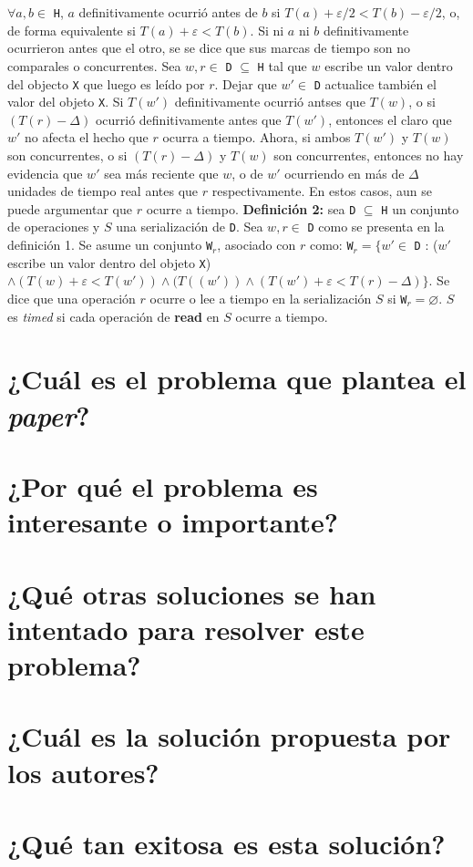 $\forall a, b \in$ \texttt{H}, $a$ definitivamente ocurrió antes de $b$ si $T(a) + \varepsilon/2 < T(b) - \varepsilon/2$, o, de forma equivalente si $T(a) + \varepsilon < T(b)$. Si ni $a$ ni $b$ definitivamente ocurrieron antes que el otro, se se dice que sus marcas de tiempo son no comparales o concurrentes. Sea $w, r \in$ \texttt{D} $\subseteq$ \texttt{H} tal que $w$ escribe un valor dentro del objecto \texttt{X} que luego es leído por $r$. Dejar que $w' \in$ \texttt{D} actualice también el valor del objeto \texttt{X}. Si $T(w')$ definitivamente ocurrió antses que $T(w)$, o si $(T(r) - \Delta)$ ocurrió definitivamente antes que $T(w')$, entonces el claro que $w'$ no afecta el hecho que $r$ ocurra a tiempo. Ahora, si ambos $T(w')$ y $T(w)$ son concurrentes, o si $(T(r) - \Delta)$ y $T(w)$ son concurrentes, entonces no hay evidencia que $w'$ sea más reciente que $w$, o de $w'$ ocurriendo en más de $\Delta$ unidades de tiempo real antes que $r$ respectivamente. En estos casos, aun se puede argumentar que $r$ ocurre a tiempo. \textbf{Definición 2:} sea \texttt{D} $\subseteq$ \texttt{H} un conjunto de operaciones y $S$ una serialización de \texttt{D}. Sea $w, r \in$ \texttt{D} como se presenta en la definición 1. Se asume un conjunto \texttt{W}$_r$, asociado con $r$ como: \texttt{W}$_r = \{w' \in$ \texttt{D} : ($w'$ escribe un valor dentro del objeto \texttt{X}) $\wedge (T(w) + \varepsilon < T(w')) \wedge (T((w')) \wedge (T(w') + \varepsilon < T(r) - \Delta)\}$. Se dice que una operación $r$ ocurre o lee a tiempo en la serialización $S$ si \texttt{W}$_r = \varnothing$. $S$ es \emph{timed} si cada operación de \textbf{read} en $S$ ocurre a tiempo.

\section{¿Cuál es el problema que plantea el \textit{paper}?}

\section{¿Por qué el problema es interesante o importante?}

\section{¿Qué otras soluciones se han intentado para resolver este problema?}
     
\section{¿Cuál es la solución propuesta por los autores?}

\section{¿Qué tan exitosa es esta solución?} 